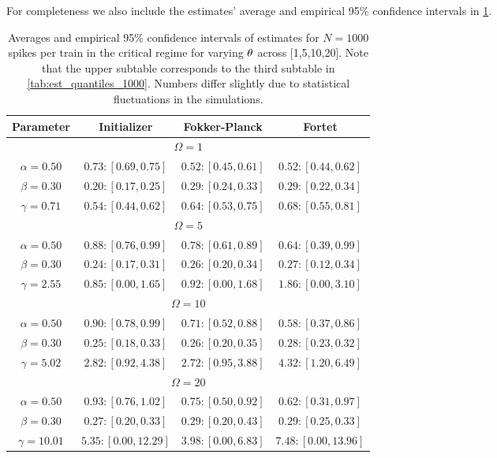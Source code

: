 For completeness we also include the estimates' average and empirical 95\%
confidence intervals in \cref{tab:thetas_est_quantiles_1000}.
\begin{table}[htp]
\begin{center}
{\begin{tabular}{|c|ccc|} 
Parameter
& Initializer
& Fokker-Planck
& Fortet
\\ 
\hline \hline
\multicolumn{4}{|c|}{$\Omega=1$} \\[1mm]
$\alpha=0.50$
& $0.73 : [0.69, 0.75]$
& $0.52 : [0.45, 0.61]$
& $0.52 : [0.44, 0.62]$
\\
$\beta=0.30$
& $0.20 : [0.17, 0.25]$
& $0.29 : [0.24, 0.33]$
& $0.29 : [0.22, 0.34]$
\\
$\gamma=0.71$
& $0.54 : [0.44, 0.62]$
& $0.64 : [0.53, 0.75]$
& $0.68 : [0.55, 0.81]$
\\
\hline \hline
\multicolumn{4}{|c|}{$\Omega=5$} \\[1mm]
$\alpha=0.50$
& $0.88 : [0.76, 0.99]$
& $0.78 : [0.61, 0.89]$
& $0.64 : [0.39, 0.99]$
\\
$\beta=0.30$
& $0.24 : [0.17, 0.31]$
& $0.26 : [0.20, 0.34]$
& $0.27 : [0.12, 0.34]$
\\
$\gamma=2.55$
& $0.85 : [0.00, 1.65]$
& $0.92 : [0.00, 1.68]$
& $1.86 : [0.00, 3.10]$
\\
\hline \hline
\multicolumn{4}{|c|}{$\Omega=10$} \\[1mm]
$\alpha=0.50$
& $0.90 : [0.78, 0.99]$
& $0.71 : [0.52, 0.88]$
& $0.58 : [0.37, 0.86]$
\\
$\beta=0.30$
& $0.25 : [0.18, 0.33]$
& $0.26 : [0.20, 0.35]$
& $0.28 : [0.23, 0.32]$
\\
$\gamma=5.02$
& $2.82 : [0.92, 4.38]$
& $2.72 : [0.95, 3.88]$
& $4.32 : [1.20, 6.49]$
\\
\hline \hline
\multicolumn{4}{|c|}{$\Omega=20$} \\[1mm]
$\alpha=0.50$
& $0.93 : [0.76, 1.02]$
& $0.75 : [0.50, 0.92]$
& $0.62 : [0.31, 0.97]$
\\
$\beta=0.30$
& $0.27 : [0.20, 0.33]$
& $0.29 : [0.20, 0.43]$
& $0.29 : [0.25, 0.33]$
\\
$\gamma=10.01$
& $5.35 : [0.00, 12.29]$
& $3.98 : [0.00, 6.83]$
& $7.48 : [0.00, 13.96]$
\\
\hline
\end{tabular}}\\
\end{center}
\caption{Averages and empirical 95\% confidence intervals of estimates for $N=1000$
spikes per train in the critical regime for varying ${ \theta}$ across
[1,5,10,20]. Note that the upper subtable corresponds to the third
subtable in \cref{tab:est_quantiles_1000}. Numbers differ slightly due to statistical
fluctuations in the simulations. }
\label{tab:thetas_est_quantiles_1000}
\end{table}


